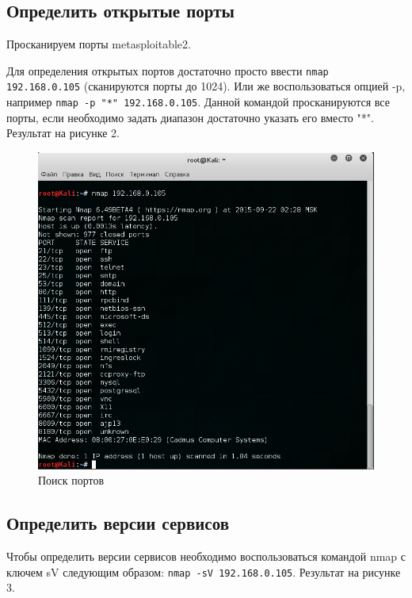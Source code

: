\documentclass[11pt, a4paper]{article}		%
\begin{document}

\subsection{Определить открытые порты}

Просканируем порты metasploitable2.

Для определения открытых портов достаточно просто ввести \verb'nmap 192.168.0.105' (сканируются порты до 1024). Или же воспользоваться опцией -p, например \verb'nmap -p "*" 192.168.0.105'. Данной командой просканируются все порты, если необходимо задать диапазон достаточно указать его вместо "*".
Результат на рисунке 2.

\begin{figure}[h!]
\centering
\includegraphics[scale=0.8]{res/2}
\caption{Поиск портов}
\end{figure}


\subsection{Определить версии сервисов}

Чтобы определить версии сервисов необходимо воспользоваться командой nmap с ключем sV следующим образом: \verb'nmap -sV 192.168.0.105'. 
Результат на рисунке 3.
\end{document}
